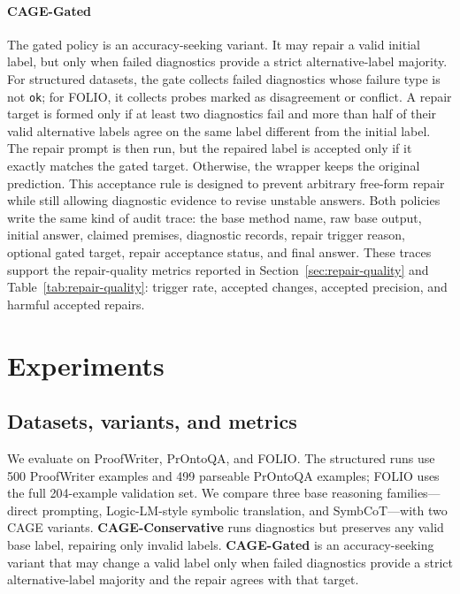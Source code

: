 \documentclass{article}
\begin{document}
\paragraph{CAGE-Gated}
The gated policy is an accuracy-seeking variant. It may repair a valid initial label, but only when failed diagnostics provide a strict alternative-label majority. For structured datasets, the gate collects failed diagnostics whose failure type is not \texttt{ok}; for FOLIO, it collects probes marked as disagreement or conflict. A repair target is formed only if at least two diagnostics fail and more than half of their valid alternative labels agree on the same label different from the initial label. The repair prompt is then run, but the repaired label is accepted only if it exactly matches the gated target. Otherwise, the wrapper keeps the original prediction. This acceptance rule is designed to prevent arbitrary free-form repair while still allowing diagnostic evidence to revise unstable answers.
Both policies write the same kind of audit trace: the base method name, raw base output, initial answer, claimed premises, diagnostic records, repair trigger reason, optional gated target, repair acceptance status, and final answer. These traces support the repair-quality metrics reported in Section~\ref{sec:repair-quality} and Table~\ref{tab:repair-quality}: trigger rate, accepted changes, accepted precision, and harmful accepted repairs.


\section{Experiments}

\subsection{Datasets, variants, and metrics}
\label{sec:datasets-metrics}

We evaluate on ProofWriter, PrOntoQA, and FOLIO. The structured runs use 500 ProofWriter examples and 499 parseable PrOntoQA examples; FOLIO uses the full 204-example validation set. We compare three base reasoning families---direct prompting, Logic-LM-style symbolic translation, and SymbCoT---with two CAGE variants. \textbf{CAGE-Conservative} runs diagnostics but preserves any valid base label, repairing only invalid labels. \textbf{CAGE-Gated} is an accuracy-seeking variant that may change a valid label only when failed diagnostics provide a strict alternative-label majority and the repair agrees with that target.
\end{document}
